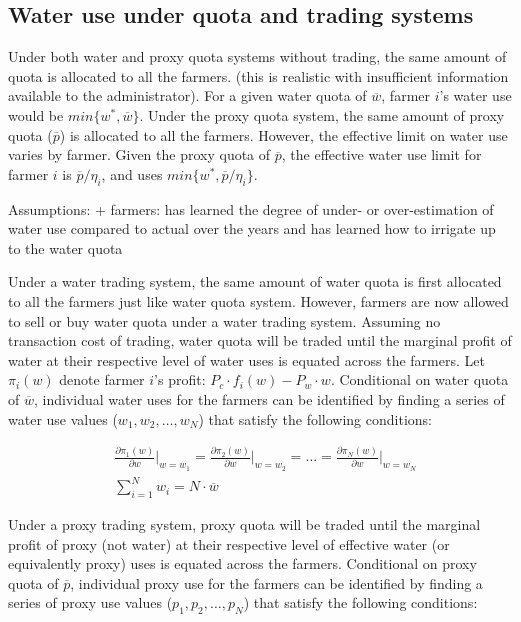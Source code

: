\documentclass[
  letterpaper,
  DIV=11,
  numbers=noendperiod]{scrartcl}
\begin{document}
\subsection{Water use under quota and trading
systems}\label{water-use-under-quota-and-trading-systems}

Under both water and proxy quota systems without trading, the same
amount of quota is allocated to all the farmers. (this is realistic with
insufficient information available to the administrator). For a given
water quota of \(\overline{w}\), farmer \(i\)'s water use would be
\(min\{w^*, \overline{w}\}\). Under the proxy quota system, the same
amount of proxy quota (\(\overline{p}\)) is allocated to all the
farmers. However, the effective limit on water use varies by farmer.
Given the proxy quota of \(\overline{p}\), the effective water use limit
for farmer \(i\) is \(\overline{p} / \eta_i\), and uses
\(min\{w^*, \overline{p} / \eta_i\}\).

Assumptions: + farmers: has learned the degree of under- or
over-estimation of water use compared to actual over the years and has
learned how to irrigate up to the water quota

Under a water trading system, the same amount of water quota is first
allocated to all the farmers just like water quota system. However,
farmers are now allowed to sell or buy water quota under a water trading
system. Assuming no transaction cost of trading, water quota will be
traded until the marginal profit of water at their respective level of
water uses is equated across the farmers. Let \(\pi_i(w)\) denote farmer
\(i\)'s profit: \(P_c \cdot f_i(w) - P_w \cdot w\). Conditional on water
quota of \(\overline{w}\), individual water uses for the farmers can be
identified by finding a series of water use values
(\(w_1, w_2, \dots, w_N\)) that satisfy the following conditions:

\begin{align}
& \frac{\partial \pi_1(w)}{\partial w}\Big\rvert_{w = w_1} = \frac{\partial \pi_2(w)}{\partial w}\Big\rvert_{w = w_2} = \dots = \frac{\partial \pi_N(w)}{\partial w}\Big\rvert_{w = w_N} \\
& \sum_{i=1}^N w_i = N \cdot \overline{w}
\end{align}

Under a proxy trading system, proxy quota will be traded until the
marginal profit of proxy (not water) at their respective level of
effective water (or equivalently proxy) uses is equated across the
farmers. Conditional on proxy quota of \(\overline{p}\), individual
proxy use for the farmers can be identified by finding a series of proxy
use values (\(p_1, p_2, \dots, p_N\)) that satisfy the following
conditions:
\end{document}
